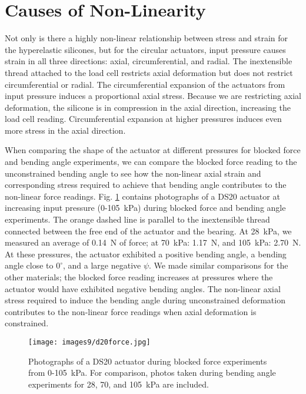 \clearpage
\section{Causes of Non-Linearity}

Not only is there a highly non-linear relationship between stress and strain for the hyperelastic silicones, but for the circular actuators, input pressure causes strain in all three directions: axial, circumferential, and radial. The inextensible thread attached to the load cell restricts axial deformation but does not restrict circumferential or radial. The circumferential expansion of the actuators from input pressure induces a proportional axial stress. Because we are restricting axial deformation, the silicone is in compression in the axial direction, increasing the load cell reading. Circumferential expansion at higher pressures induces even more stress in the axial direction. 

When comparing the shape of the actuator at different pressures for blocked force and bending angle experiments, we can compare the blocked force reading to the unconstrained bending angle to see how the non-linear axial strain and corresponding stress required to achieve that bending angle contributes to the non-linear force readings. Fig. \ref{fig:d20force} contains photographs of a DS20 actuator at increasing input pressure (0-105~kPa) during blocked force and bending angle experiments. The orange dashed line is parallel to the inextensible thread connected between the free end of the actuator and the bearing. At 28~kPa, we measured an average of 0.14~N of force; at 70~kPa: 1.17~N, and 105~kPa: 2.70~N. At these pressures, the actuator exhibited a positive bending angle, a bending angle close to $0^\circ$, and a large negative $\psi$. We made similar comparisons for the other materials; the blocked force reading increases at pressures where the actuator would have exhibited negative bending angles. The non-linear axial stress required to induce the bending angle during unconstrained deformation contributes to the non-linear force readings when axial deformation is constrained. 

\begin{figure}[ht]
    \centering
     \texttt{[image: images9/d20force.jpg]}
    \caption{Photographs of a DS20 actuator during blocked force experiments from 0-105~kPa. For comparison, photos taken during bending angle experiments for 28, 70, and 105~kPa are included.}
    \label{fig:d20force}
\end{figure}

